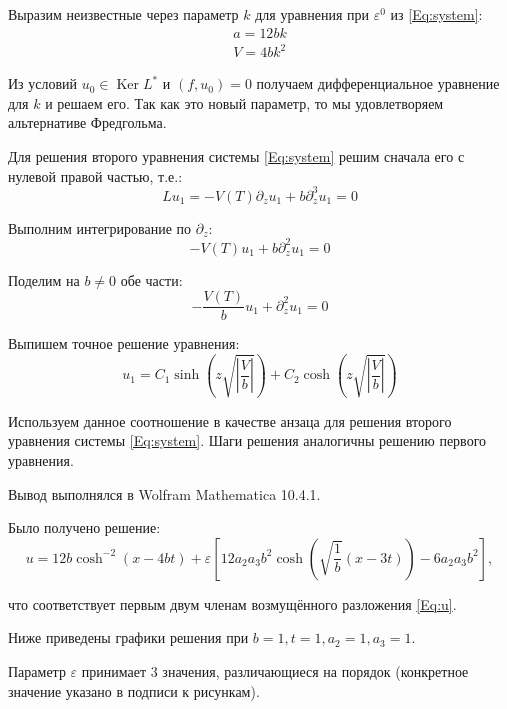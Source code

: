 Выразим неизвестные через параметр $k$
для уравнения при $\varepsilon^0$ из \eqref{Eq:system}:
\begin{equation*}
    \begin{gathered}
        a = 12 b k \\
        V = 4 b k^2
    \end{gathered}
\end{equation*}

Из условий $u_0 \in \operatorname{Ker}L^*$
и $(f, u_0) = 0$ получаем дифференциальное уравнение
для $k$ и решаем его. Так как это новый параметр,
то мы удовлетворяем альтернативе Фредгольма.

Для решения второго уравнения системы \eqref{Eq:system}
решим сначала его с нулевой правой частью, т.е.:
\begin{equation*}
    L u_1 = -V(T) \partial_z u_1 + b \partial_z^3 u_1 = 0
\end{equation*}

Выполним интегрирование по $\partial_z$:
\begin{equation*}
    -V(T) u_1 + b \partial_z^2 u_1 = 0
\end{equation*}

Поделим на $b \neq 0$ обе части:
\begin{equation*}
    -\frac{V(T)}{b} u_1 + \partial_z^2 u_1 = 0
\end{equation*}

Выпишем точное решение уравнения:
\begin{equation*}
    u_1 = C_1 \sinh(z \sqrt{ \left|\frac{V}{b}\right|} ) +
    C_2 \cosh(z \sqrt{ \left|\frac{V}{b}\right|})
\end{equation*}

Используем данное соотношение в качестве анзаца
для решения второго уравнения системы \eqref{Eq:system}.
Шаги решения аналогичны решению первого уравнения.

Вывод выполнялся в Wolfram Mathematica 10.4.1.

Было получено решение:
\begin{equation*}
    u = 12 b \cosh^{-2}(x - 4 b t) +
    \varepsilon \left[ 12 a_2 a_3 b^2 \cosh(\sqrt{\frac{1}{b}} (x - 3 t)) -
    6 a_2 a_3 b^2 \right],
\end{equation*}

что соответствует первым двум членам возмущённого разложения \eqref{Eq:u}.

Ниже приведены графики решения
при $b = 1, t = 1, a_2 = 1, a_3 = 1$.

Параметр $\varepsilon$ принимает 3 значения,
различающиеся на порядок (конкретное значение указано в подписи к рисункам).

